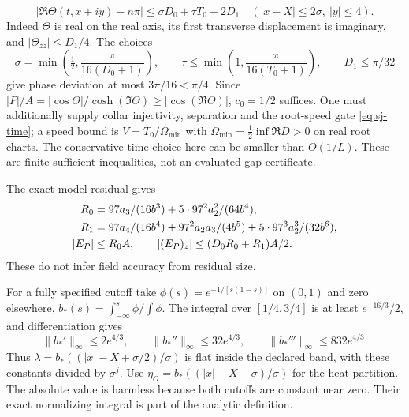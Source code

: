 \begin{equation}
 |\Re\Theta(t,x+iy)-n\pi|\le\sigma D_0+\tau T_0+2D_1
 \quad(|x-X|\le2\sigma,\ |y|\le4).
 \label{eq:fi-phase}
\end{equation}
Indeed $\Theta$ is real on the real axis, its first transverse
displacement is imaginary, and $|\Theta_{zz}|\le D_1/4$.
The choices
\begin{equation}
 \sigma=\min\left(\tfrac12,\frac{\pi}{16(D_0+1)}\right),\qquad
 \tau\le\min\left(1,\frac{\pi}{16(T_0+1)}\right),\qquad D_1\le\pi/32
 \label{eq:fi-gap-choice}
\end{equation}
give phase deviation at most $3\pi/16<\pi/4$. Since
$|P|/A=|\cos\Theta|/\cosh(\Im\Theta)\ge|\cos(\Re\Theta)|$,
$c_0=1/2$ suffices. One must additionally supply collar injectivity,
separation and the root-speed gate \eqref{eq:sj-time}; a speed bound
is $V=T_0/\Omega_{\min}$ with
$\Omega_{\min}=\tfrac12\inf\Re D>0$ on real root charts.
The conservative time choice here can be smaller than $O(1/L)$.
These are finite sufficient inequalities, not an evaluated gap certificate.

The exact model residual gives
\begin{align}
 R_0&=97a_3/(16b^3)+5\cdot97^2a_2^2/(64b^4),\notag\\
 R_1&=97a_4/(16b^4)+97^2a_2a_3/(4b^5)
                              +5\cdot97^3a_2^3/(32b^6),\notag\\
 |E_P|&\le R_0A,\qquad |(E_P)_z|\le(D_0R_0+R_1)A/2.
 \label{eq:fi-residual-caps}
\end{align}
These do not infer field accuracy from residual size.

For a fully specified cutoff take
$\phi(s)=e^{-1/[s(1-s)]}$ on $(0,1)$ and zero elsewhere,
$b_*(s)=\int_{-\infty}^s\phi/\int\phi$. The integral over
$[1/4,3/4]$ is at least $e^{-16/3}/2$, and differentiation gives
\[
 \|b_*'\|_\infty\le2e^{4/3},\qquad
 \|b_*''\|_\infty\le32e^{4/3},\qquad
 \|b_*'''\|_\infty\le832e^{4/3}.
\]
Thus $\lambda=b_*((|x|-X+\sigma/2)/\sigma)$ is flat inside the
declared band, with these constants divided by $\sigma^j$.
Use $\eta_O=b_*((|x|-X-\sigma)/\sigma)$ for the heat partition.
The absolute value is harmless because both cutoffs are constant near
zero. Their exact normalizing integral is part of the analytic definition.

